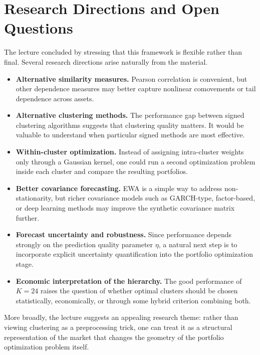 \documentclass[11pt]{article}
\begin{document}
\section{Research Directions and Open Questions}

The lecture concluded by stressing that this framework is flexible rather than final. Several research directions arise naturally from the material.

\begin{itemize}
\item \textbf{Alternative similarity measures.} Pearson correlation is convenient, but other dependence measures may better capture nonlinear comovements or tail dependence across assets.
\item \textbf{Alternative clustering methods.} The performance gap between signed clustering algorithms suggests that clustering quality matters. It would be valuable to understand when particular signed methods are most effective.
\item \textbf{Within-cluster optimization.} Instead of assigning intra-cluster weights only through a Gaussian kernel, one could run a second optimization problem inside each cluster and compare the resulting portfolios.
\item \textbf{Better covariance forecasting.} EWA is a simple way to address non-stationarity, but richer covariance models such as GARCH-type, factor-based, or deep learning methods may improve the synthetic covariance matrix further.
\item \textbf{Forecast uncertainty and robustness.} Since performance depends strongly on the prediction quality parameter $\eta$, a natural next step is to incorporate explicit uncertainty quantification into the portfolio optimization stage.
\item \textbf{Economic interpretation of the hierarchy.} The good performance of $K=24$ raises the question of whether optimal clusters should be chosen statistically, economically, or through some hybrid criterion combining both.
\end{itemize}

More broadly, the lecture suggests an appealing research theme: rather than viewing clustering as a preprocessing trick, one can treat it as a structural representation of the market that changes the geometry of the portfolio optimization problem itself.
\end{document}
